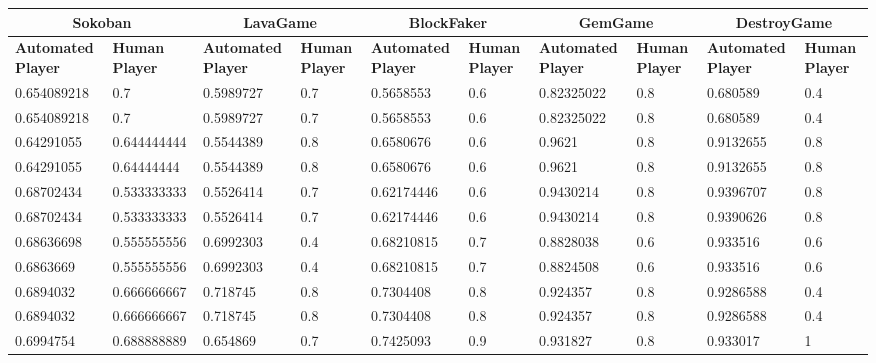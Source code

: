 
\begin{landscape}
\begin{table}[!ht]
	\centering
	\begin{tabular}{|p{0.8in}|p{0.8in}|p{0.8in}|p{0.8in}|p{0.8in}|p{0.8in}|p{0.8in}|p{0.8in}|p{0.8in}|p{0.8in}|}
		\hline
		\multicolumn{2}{c}{\textbf{Sokoban}} & \multicolumn{2}{c}{\textbf{LavaGame}} & \multicolumn{2}{c}{\textbf{\textbf{BlockFaker}}} & \multicolumn{2}{c}{\textbf{GemGame}} & \multicolumn{2}{c}{\textbf{DestroyGame}}\\
		\hline
		\textbf{Automated Player} & \textbf{Human Player} & \textbf{Automated Player} & \textbf{Human Player} & \textbf{Automated Player} & \textbf{Human Player} & \textbf{Automated Player} & \textbf{Human Player} & \textbf{Automated Player} & \textbf{Human Player}\\
		\hline
		0.654089218 & 0.7 & 0.5989727 & 0.7 & 0.5658553 & 0.6 & 0.82325022 & 0.8 & 0.680589 & 0.4\\
		\hline
		0.654089218 & 0.7 & 0.5989727 & 0.7 & 0.5658553 & 0.6 & 0.82325022 & 0.8 & 0.680589 & 0.4\\
		\hline
		0.64291055 & 0.644444444 & 0.5544389 & 0.8 & 0.6580676 & 0.6 & 0.9621 & 0.8 & 0.9132655 & 0.8\\
		\hline
		0.64291055 & 0.64444444 & 0.5544389 & 0.8 & 0.6580676 & 0.6 & 0.9621 & 0.8 & 0.9132655 & 0.8\\
		\hline
		0.68702434 & 0.533333333 & 0.5526414 & 0.7 & 0.62174446 & 0.6 & 0.9430214 & 0.8 & 0.9396707 & 0.8\\
		\hline
		0.68702434 & 0.533333333 & 0.5526414 & 0.7 & 0.62174446 & 0.6 & 0.9430214 & 0.8 & 0.9390626 & 0.8\\
		\hline
		0.68636698 & 0.555555556 & 0.6992303 & 0.4 & 0.68210815 & 0.7 & 0.8828038 & 0.6 & 0.933516 & 0.6\\
		\hline
		0.6863669 & 0.555555556 & 0.6992303 & 0.4 & 0.68210815 & 0.7 & 0.8824508 & 0.6 & 0.933516 & 0.6\\
		\hline
		0.6894032 & 0.666666667 & 0.718745 & 0.8 & 0.7304408 & 0.8 & 0.924357 & 0.8 & 0.9286588 & 0.4\\
		\hline
		0.6894032 & 0.666666667 & 0.718745 & 0.8 & 0.7304408 & 0.8 & 0.924357 & 0.8 & 0.9286588 & 0.4\\
		\hline
		0.6994754 & 0.688888889 & 0.654869 & 0.7 & 0.7425093 & 0.9 & 0.931827 & 0.8 & 0.933017 & 1\\

\end{tabular}
\end{table}
\end{landscape}
